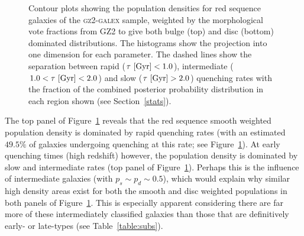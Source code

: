 \begin{figure}
\caption[Smooth and disc weighted population densities of red sequence galaxies]{Contour plots showing the population densities for red sequence galaxies of the \textsc{gz2-galex} sample, weighted by the morphological vote fractions from GZ2 to give both bulge (top) and disc (bottom) dominated distributions. The histograms show the projection into one dimension for each parameter. The dashed lines show the separation between rapid ($\tau ~\rm{[Gyr]} < 1.0$), intermediate ($1.0 < \tau ~\rm{[Gyr]} < 2.0$) and slow ($\tau ~\rm{[Gyr]} > 2.0$) quenching rates with the fraction of the combined posterior probability distribution in each region shown (see Section~\ref{stats}).}
\label{red_s}
\end{figure}

The top panel of Figure~\ref{red_s} reveals that the red sequence smooth weighted population density is dominated by rapid quenching rates (with an estimated $49.5\%$ of galaxies undergoing quenching at this rate; see Figure~\ref{red_s}). At early quenching times (high redshift) however, the population density is dominated by slow and intermediate rates (top panel of Figure~\ref{red_s}). Perhaps this is the influence of intermediate galaxies (with $p_s \sim p_d \sim 0.5$), which would explain why similar high density areas exist for both the smooth and disc weighted populations in both panels of Figure~\ref{red_s}. This is especially apparent considering there are far more of these intermediately classified galaxies than those that are definitively early- or late-types (see Table~\ref{table:subs}). 

